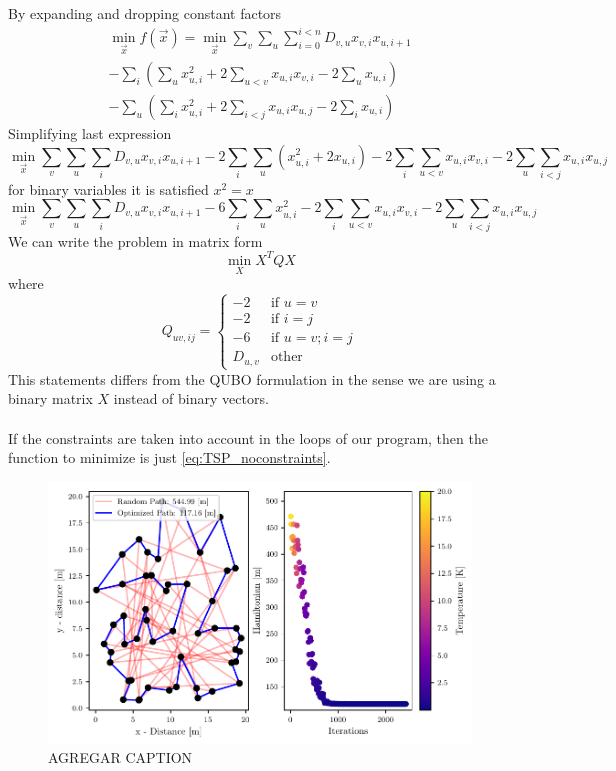 By expanding and dropping constant factors
\begin{align*}
    \min_{\vec{x}} f(\vec{x}) = \min_{\vec{x}} \sum_{v} \sum_{u} \sum_{i=0}^{i<n}D_{v,u}x_{v,i}x_{u, i+1} \\
    -\sum_{i}\left( \sum_{u}x_{u,i}^{2} + 2\sum_{u<v}x_{u,i}x_{v,i} - 2\sum_{u}x_{u,i}\right)  \\
    - \sum_{u}\left( \sum_{i}x_{u,i}^{2} + 2\sum_{i<j}x_{u,i}x_{u,j} - 2\sum_{i}x_{u,i}\right)
\end{align*}
Simplifying last expression
\begin{equation}
    \min_{\vec{x}} \sum_{v} \sum_{u} \sum_{i}D_{v,u}x_{v,i}x_{u, i+1} - 2 \sum_{i}\sum_{u} \left(x_{u,i}^{2} + 2 x_{u,i} \right) - 2 \sum_{i}\sum_{u<v}x_{u,i}x_{v,i}- 2 \sum_{u}\sum_{i<j}x_{u,i}x_{u,j}
\end{equation}
for binary variables it is satisfied $x^{2} = x$
\begin{equation}
       \min_{\vec{x}} \sum_{v} \sum_{u} \sum_{i}D_{v,u}x_{v,i}x_{u, i+1} - 6 \sum_{i}\sum_{u} x_{u,i}^{2} - 2 \sum_{i}\sum_{u<v}x_{u,i}x_{v,i}- 2 \sum_{u}\sum_{i<j}x_{u,i}x_{u,j}
\end{equation}
We can write the problem in matrix form
\begin{equation}
    \min_{X} X^{T} Q X
\end{equation}
where
\begin{equation}
Q_{uv,ij} = 
    \begin{cases}
    -2  & \text{if } u=v \\
    -2  & \text{if } i=j \\
    -6  & \text{if } u=v;i=j \\
    D_{u,v} & \text{other }
    \end{cases}
\end{equation}
This statements differs from the QUBO formulation in the sense we are using a binary matrix $X$ instead of binary vectors.\\\\
If the constraints are taken into account in the loops of our program, then the function to minimize is just \ref{eq:TSP_noconstraints}.
\begin{figure}
    \centering
    \includegraphics[width=\textwidth]{Figures/TSP_SA.pdf}
    \caption{AGREGAR CAPTION}
    \label{fig:TSP_SA}
\end{figure}


